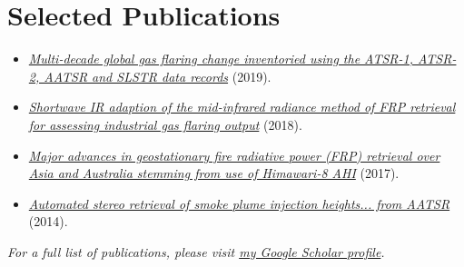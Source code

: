 \documentclass[10pt,a4paper]{article}
\begin{document}
\section*{Selected Publications}
\begin{itemize}
    \item \href{https://doi.org/10.1016/j.rse.2019.111298}{\textit{Multi-decade global gas flaring change inventoried using the ATSR-1, ATSR-2, AATSR and SLSTR data records}} (2019).
    \item \href{https://doi.org/10.3390/rs10020305}{\textit{Shortwave IR adaption of the mid-infrared radiance method of FRP retrieval for assessing industrial gas flaring output}} (2018).
    \item \href{https://doi.org/10.1016/j.rse.2017.02.024}{\textit{Major advances in geostationary fire radiative power (FRP) retrieval over Asia and Australia stemming from use of Himawari-8 AHI}} (2017).
    \item \href{https://doi.org/10.1109/TGRS.2013.2249071}{\textit{Automated stereo retrieval of smoke plume injection heights... from AATSR}} (2014).
\end{itemize}
\vspace{0.5em}
\noindent \textit{For a full list of publications, please visit \href{https://scholar.google.co.uk/citations?user=P_dL0zcAAAAJ&hl=en}{my Google Scholar profile}.}
\end{document}
